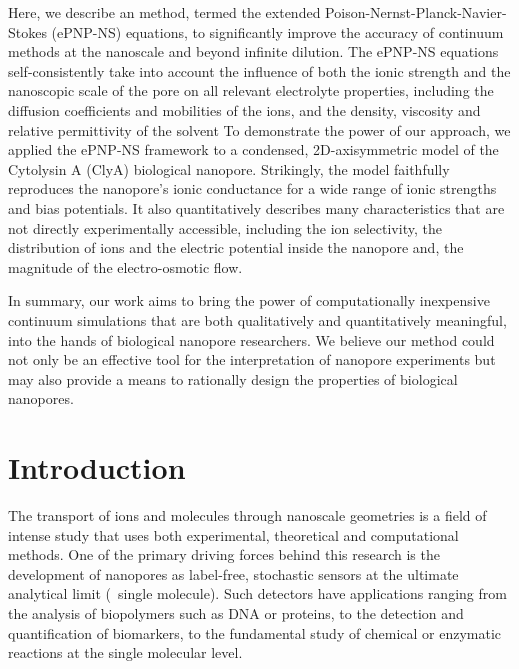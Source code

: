 \documentclass[journal=ancac3,manuscript=article,etalmode=truncate,maxauthors=0,layout=onecolumn]{achemso}
\begin{document}
Here, we describe an method, termed the extended Poison-Nernst-Planck-Navier-Stokes (ePNP-NS) equations, to significantly improve the accuracy of continuum methods at the nanoscale and beyond infinite dilution. The ePNP-NS equations self-consistently take into account the influence of both the ionic
strength and the nanoscopic scale of the pore on all relevant electrolyte properties, including the diffusion coefficients and mobilities of the ions, and the density, viscosity and relative permittivity of the solvent To demonstrate the power of our approach, we applied the ePNP-NS framework to a condensed, 2D-axisymmetric model of the Cytolysin A (ClyA) biological nanopore. Strikingly, the model faithfully reproduces the nanopore’s ionic conductance for a wide range of ionic strengths and bias potentials. It also quantitatively describes many characteristics that are not directly experimentally accessible, including the ion selectivity, the distribution of ions and the electric potential inside the nanopore and, the magnitude of the electro-osmotic flow.

In summary, our work aims to bring the power of computationally inexpensive continuum simulations that are both qualitatively and quantitatively meaningful, into the hands of biological nanopore researchers. We believe our method could not only be an effective tool for the interpretation of nanopore experiments but may also provide a means to rationally design the properties of biological nanopores.



\section{Introduction}

The transport of ions and molecules through nanoscale geometries is a field of intense study that uses both
experimental, theoretical and computational methods.\cite{Sparreboom-2010,Bocquet-2010,Maffeo-2012,
Thomas-2014,Wang-2014,Kim-2015} One of the primary driving forces behind this research is the development of
nanopores as label-free, stochastic sensors at the ultimate analytical limit (\ie{}~single molecule).
\cite{Bayley-2001,Dekker-2007,Venkatesan-2011,Zhang-2016} Such detectors have applications ranging from the
analysis of biopolymers such as
DNA\cite{Deamer-2016,Kasianowicz-1996,Meller-2000,Maglia-2008,Butler-2008,Stoddart-2009,Franceschini-2013,Jain-2018}
or proteins,\cite{Restrepo-Perez-2018,Talaga-2009,Rodriguez-Larrea-2013, Nivala-2013,Kennedy-2016} to the
detection and quantification of
biomarkers,\cite{Chen-2013,Soskine-2012,Niedzwiecki-2013,VanMeervelt-2014,Huang-2017,Liu-2018,Galenkamp-2018}
to the fundamental study of chemical or enzymatic reactions at the single molecular
level.\cite{Willems-VanMeervelt-2017,Lieberman-2010, Nivala-2013,Ho-2015,Laszlo-2017}
\end{document}
